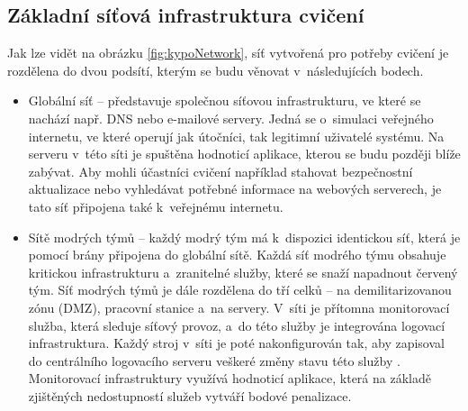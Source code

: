 \documentclass[
  digital,
  twoside,
  table, 
  nolof, 
  nolot
]{fithesis3}
\begin{document}
\subsection{Základní síťová infrastruktura cvičení}
Jak lze vidět na obrázku \ref{fig:kypoNetwork}, síť vytvořená pro potřeby cvičení je rozdělena do dvou podsítí, kterým se budu věnovat v~následujících bodech.

\begin{itemize}
    \item Globální síť -- představuje společnou síťovou infrastrukturu, ve které se nachází např. DNS nebo e-mailové servery. Jedná se o~simulaci veřejného internetu, ve které operují jak útočníci, tak legitimní uživatelé systému. Na serveru v~této síti je spuštěna hodnoticí aplikace, kterou se budu později blíže zabývat. Aby mohli účastníci cvičení například stahovat bezpečnostní aktualizace nebo vyhledávat potřebné informace na webových serverech, je tato síť připojena také k~veřejnému internetu.
    \item Sítě modrých týmů -- každý modrý tým má k~dispozici identickou síť, která je pomocí brány připojena do globální sítě. Každá síť modrého týmu obsahuje kritickou infrastrukturu a~zranitelné služby, které se snaží napadnout červený tým. Síť modrých týmů je dále rozdělena do tří celků -- na demilitarizovanou zónu (DMZ), pracovní stanice a~na servery. V~síti je přítomna monitorovací služba, která sleduje síťový provoz, a~do této služby je integrována logovací infrastruktura. Každý stroj v~síti je poté nakonfigurován tak, aby zapisoval do centrálního logovacího serveru veškeré změny stavu této služby \cite{1319597}. Monitorovací infrastruktury využívá hodnoticí aplikace, která na základě zjištěných nedostupností služeb vytváří bodové penalizace.
\end{itemize}
\end{document}

